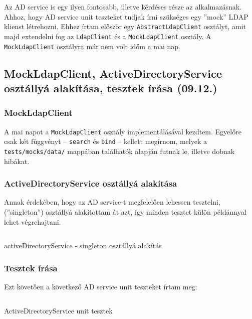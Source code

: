 \documentclass[a4paper]{article}
\newcommand{\inlts}[1]{\texttt{#1}}
\begin{document}
Az AD service is egy ilyen fontosabb, illetve kérdéses része az alkalmazásnak. Ahhoz, hogy AD service
unit teszteket tudjak írni szükséges egy ”mock” LDAP klienst létrehozni. Ehhez írtam először egy
\inlts{AbstractLdapClient} osztályt, amit majd extendelni fog az \inlts{LdapClient} és a \inlts{MockLdapClient}
osztály. A \inlts{MockLdapClient} osztályra már nem volt időm a mai nap.

\subsection{MockLdapClient, ActiveDirectoryService osztállyá alakítása, tesztek
írása (09.12.)}

\subsubsection*{MockLdapClient}

A mai napot a \inlts{MockLdapClient} osztály implementálásával kezdtem. Egyelőre csak két függvényt –
\inlts{search} és \inlts{bind} – kellett megírnom, melyek a \inlts{tests/mocks/data/} mappában találhatók alapján
futnak le, illetve dobnak hibákat.

\subsubsection*{ActiveDirectoryService osztállyá alakítása}

Annak érdekében, hogy az AD service-t megfelelően lehessen tesztelni, (”singleton”) osztállyá
alakítottam át azt, így minden tesztet külön példánnyal lehet végrehajtani.

\begin{listing}[!ht]
\inputminted[bgcolor=codebg, breaklines, breakanywhere, fontsize=\small]{typescript}{code/activeDirectoryServiceSingleton.ts}
\caption{activeDirectoryService - singleton osztállyá alakítás}
\label{listing:6}
\end{listing}

\subsubsection*{Tesztek írása}

Ezt követően a következő AD service unit teszteket írtam meg:

\begin{listing}[!ht]
\inputminted[bgcolor=codebg, breaklines, breakanywhere, fontsize=\small]{text}{code/activeDirectoryServiceTests.txt}
\caption{ActiveDirectoryService unit tesztek}
\label{listing:7}
\end{listing}
\end{document}
